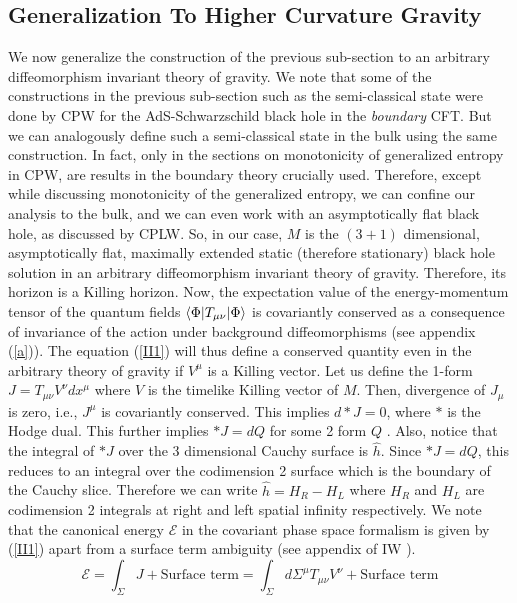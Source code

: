 \documentclass[12pt]{article}
\DeclarePairedDelimiter\bra{\langle}{\rvert}
\DeclarePairedDelimiter\ket{\lvert}{\rangle}
\begin{document}
\subsection{Generalization To Higher Curvature Gravity}
We now generalize the construction of the previous sub-section to an arbitrary diffeomorphism invariant theory of gravity. We note that some of the constructions in the previous sub-section such as the semi-classical state were done by CPW for the AdS-Schwarzschild black hole in the \emph{boundary} CFT. But we can analogously define such a semi-classical state in the bulk using the same construction. In fact, only in the sections on monotonicity of generalized entropy in CPW, are results in the boundary theory crucially used. Therefore, except while discussing monotonicity of the generalized entropy, we can confine our analysis to the bulk, and we can even work with an asymptotically flat black hole, as discussed by CPLW.
So, in our case, $M$ is the $(3+1)$ dimensional, asymptotically flat, maximally extended static (therefore stationary) black hole solution in an arbitrary diffeomorphism invariant theory of gravity. Therefore, its horizon is a Killing horizon. Now, the expectation value of the energy-momentum tensor of the quantum fields $\bra{{\Phi}}T_{\mu \nu} \ket{{\Phi}}$ is covariantly conserved as a consequence of invariance of the action under background diffeomorphisms (see appendix (\ref{a})). The equation (\ref{II1}) will thus define a conserved quantity even in the arbitrary theory of gravity if $V^{\mu}$ is a Killing vector.
Let us define the 1-form $J= T_{\mu \nu}V^{\nu}dx^\mu$ where $V$ is the timelike Killing vector of $M$. Then, divergence of $J_{\mu}$ is zero, i.e., $J^{\mu}$ is covariantly conserved. This implies $d* J=0$, where $*$ is the Hodge dual. This further implies $*J = dQ$ for some 2 form $Q$ \cite{compere}. Also, notice that the integral of $*J$ over the 3 dimensional Cauchy surface is  $\hat{h}$. Since $*J = dQ$, this reduces to an integral over the codimension 2 surface which is the boundary of the Cauchy slice. Therefore we can write $\hat{h}= H_R-H_L$ where $H_R$ and $H_L$ are codimension 2 integrals at right and left spatial infinity respectively. We note that the canonical energy $\mathcal{E}$ in the covariant phase space formalism is given by (\ref{II1}) apart from a surface term ambiguity (see appendix of IW \cite{VR}).
\begin{equation}\label{III}
\mathcal{E}= \int_{\Sigma} J + \text{Surface term}= \int_{\Sigma}d\Sigma^{\mu}T_{\mu \nu}V^{\nu} +\text{Surface term}
\end{equation}
\end{document}
